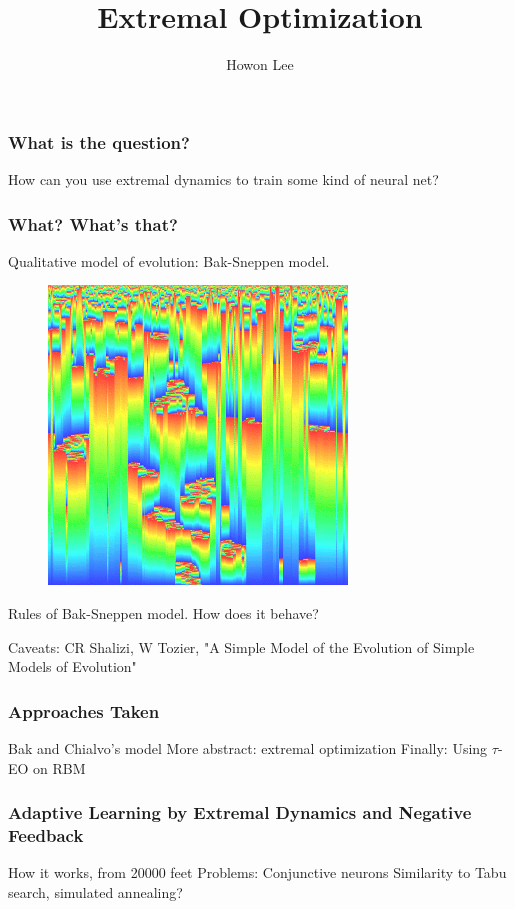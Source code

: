 \documentclass{beamer}
\begin{document}
\title{Extremal Optimization}
\author{Howon Lee}
\maketitle

\begin{frame}
  \frametitle{What is the question?}
  How can you use extremal dynamics to train some kind of neural net?
\end{frame}

\begin{frame}
  \frametitle{What? What's that?}
  Qualitative model of evolution: Bak-Sneppen model.
  \begin{figure}
    \includegraphics{bak_sneppen}
  \end{figure}

  Rules of Bak-Sneppen model. How does it behave?

  Caveats: CR Shalizi, W Tozier, "A Simple Model of the Evolution of Simple Models of Evolution"
\end{frame}

\begin{frame}
  \frametitle{Approaches Taken}
  Bak and Chialvo's model
  More abstract: extremal optimization
  Finally: Using $\tau$-EO on RBM
\end{frame}

\begin{frame}
  \frametitle{Adaptive Learning by Extremal Dynamics and Negative Feedback}
  How it works, from 20000 feet
  Problems: Conjunctive neurons
  Similarity to Tabu search, simulated annealing?
\end{frame}
\end{document}
